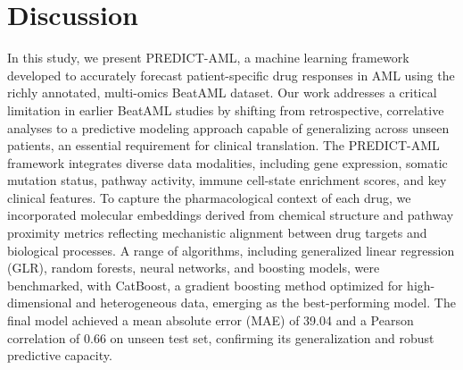 \documentclass[pdflatex,sn-mathphys-num]{sn-jnl}%
\theoremstyle{thmstyleone}%
\theoremstyle{thmstyletwo}%
\theoremstyle{thmstylethree}%
\begin{document}
\section{Discussion}\label{sec4}
In this study, we present PREDICT-AML, a machine learning framework developed to accurately forecast patient-specific drug responses in AML using the richly annotated, multi-omics BeatAML dataset. 
Our work addresses a critical limitation in earlier BeatAML studies by shifting from retrospective, correlative analyses to a predictive modeling approach capable of generalizing across unseen patients, an essential requirement for clinical translation. 
The PREDICT-AML framework integrates diverse data modalities, including gene expression, somatic mutation status, pathway activity, immune cell-state enrichment scores, and key clinical features. 
To capture the pharmacological context of each drug, we incorporated molecular embeddings derived from chemical structure and pathway proximity metrics reflecting mechanistic alignment between drug targets and biological processes. 
A range of algorithms, including generalized linear regression (GLR), random forests, neural networks, and boosting models, were benchmarked, with CatBoost, a gradient boosting method optimized for high-dimensional and heterogeneous data, emerging as the best-performing model. 
The final model achieved a mean absolute error (MAE) of 39.04 and a Pearson correlation of 0.66 on unseen test set, confirming its generalization and robust predictive capacity.
\end{document}
